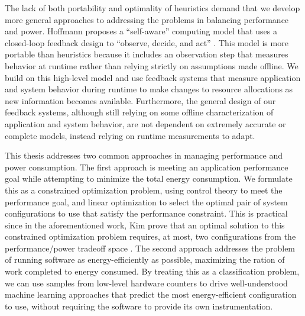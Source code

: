 The lack of both portability and optimality of heuristics demand that we develop more general approaches to addressing the problems in balancing performance and power.
Hoffmann proposes a ``self-aware'' computing model that uses a closed-loop feedback design to ``observe, decide, and act'' .
This model is more portable than heuristics because it includes an observation step that measures behavior at runtime rather than relying strictly on assumptions made offline.
We build on this high-level model and use feedback systems that measure application and system behavior during runtime to make changes to resource allocations as new information becomes available.
Furthermore, the general design of our feedback systems, although still relying on some offline characterization of application and system behavior, are not dependent on extremely accurate or complete models, instead relying on runtime measurements to adapt.


This thesis addresses two common approaches in managing performance and power consumption.
The first approach is meeting an application performance goal while attempting to minimize the total energy consumption.
We formulate this as a constrained optimization problem, using control theory to meet the performance goal, and linear optimization to select the optimal pair of system configurations to use that satisfy the performance constraint.
This is practical since in the aforementioned work, Kim \etal prove that an optimal solution to this constrained optimization problem requires, at most, two configurations from the performance/power tradeoff space \cite{kim-cpsna2015}.
The second approach addresses the problem of running software as energy-efficiently as possible, \ie maximizing the ration of work completed to energy consumed.
By treating this as a classification problem, we can use samples from low-level hardware counters to drive well-understood machine learning approaches that predict the most energy-efficient configuration to use, without requiring the software to provide its own instrumentation.

